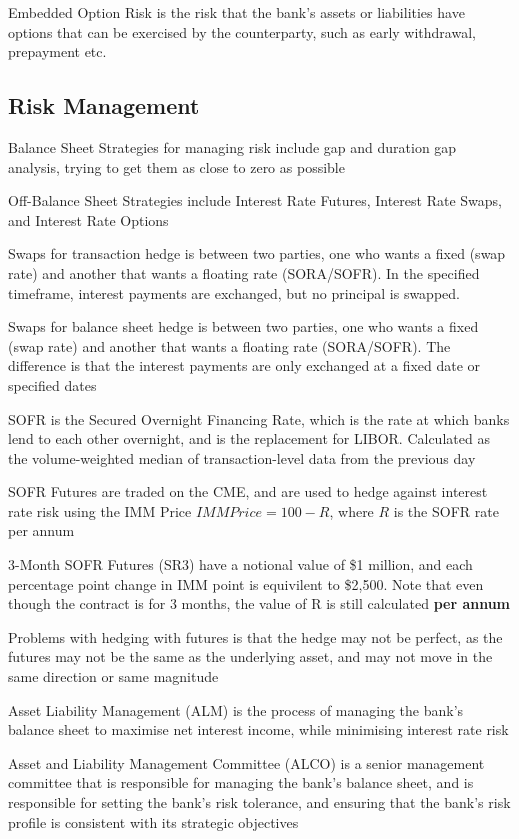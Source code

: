 Embedded Option Risk is the risk that the bank's assets or liabilities have options that can be exercised by the counterparty, such as early withdrawal, prepayment etc.

\subsection{Risk Management}
Balance Sheet Strategies for managing risk include gap and duration
gap analysis, trying to get them as close to zero as possible

Off-Balance Sheet Strategies include Interest Rate Futures, Interest Rate Swaps, and Interest Rate Options

Swaps for transaction hedge is between two parties, one who wants a fixed (swap rate) and another that wants a floating rate (SORA/SOFR).
In the specified timeframe, interest payments are exchanged, but no principal is swapped.

Swaps for balance sheet hedge is between two parties, one who wants a fixed (swap rate) and another that wants a floating rate (SORA/SOFR).
The difference is that the interest payments are only exchanged at a fixed date or specified dates

SOFR is the Secured Overnight Financing Rate, which is the rate at which banks lend to each other overnight, and is the replacement for LIBOR.
Calculated as the volume-weighted median of transaction-level data from the previous day

SOFR Futures are traded on the CME, and are used to hedge against interest rate risk using the IMM Price
$IMM Price = 100 - R$, where $R$ is the SOFR rate per annum

3-Month SOFR Futures (SR3) have a notional value of \$1 million, and each percentage point change in IMM point is equivilent to \$2,500. Note that even though the contract is for 3 months, the value of R is still calculated \textbf{per annum}

Problems with hedging with futures is that the hedge may not be perfect, as the futures may not be the same as the underlying asset, and may not move in the same direction or same magnitude

Asset Liability Management (ALM) is the process of managing the bank's balance sheet to maximise net interest income, while minimising interest rate risk

Asset and Liability Management Committee (ALCO) is a senior management committee that is responsible for managing the bank's balance sheet, and is responsible for setting the bank's risk tolerance, and ensuring that the bank's risk profile is consistent with its strategic objectives

